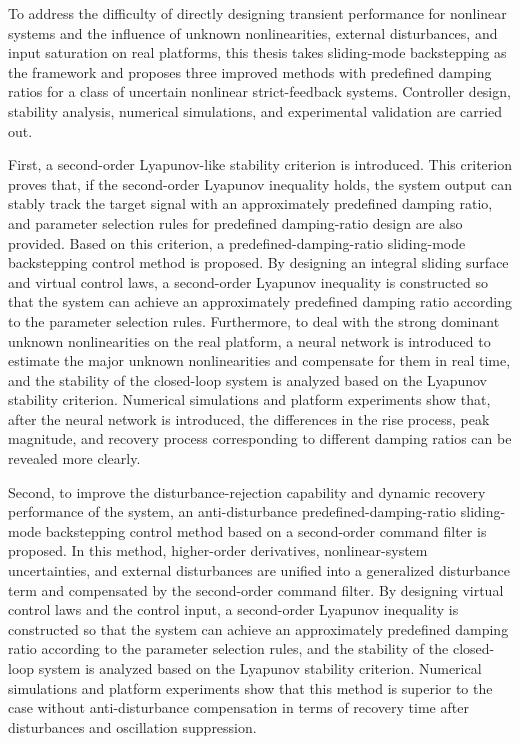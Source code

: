 \begin{eabstract}
To address the difficulty of directly designing transient performance for nonlinear systems and the influence of unknown nonlinearities, external disturbances, and input saturation on real platforms, this thesis takes sliding-mode backstepping as the framework and proposes three improved methods with predefined damping ratios for a class of uncertain nonlinear strict-feedback systems. Controller design, stability analysis, numerical simulations, and experimental validation are carried out.

First, a second-order Lyapunov-like stability criterion is introduced. This criterion proves that, if the second-order Lyapunov inequality holds, the system output can stably track the target signal with an approximately predefined damping ratio, and parameter selection rules for predefined damping-ratio design are also provided. Based on this criterion, a predefined-damping-ratio sliding-mode backstepping control method is proposed. By designing an integral sliding surface and virtual control laws, a second-order Lyapunov inequality is constructed so that the system can achieve an approximately predefined damping ratio according to the parameter selection rules. Furthermore, to deal with the strong dominant unknown nonlinearities on the real platform, a neural network is introduced to estimate the major unknown nonlinearities and compensate for them in real time, and the stability of the closed-loop system is analyzed based on the Lyapunov stability criterion. Numerical simulations and platform experiments show that, after the neural network is introduced, the differences in the rise process, peak magnitude, and recovery process corresponding to different damping ratios can be revealed more clearly.

Second, to improve the disturbance-rejection capability and dynamic recovery performance of the system, an anti-disturbance predefined-damping-ratio sliding-mode backstepping control method based on a second-order command filter is proposed. In this method, higher-order derivatives, nonlinear-system uncertainties, and external disturbances are unified into a generalized disturbance term and compensated by the second-order command filter. By designing virtual control laws and the control input, a second-order Lyapunov inequality is constructed so that the system can achieve an approximately predefined damping ratio according to the parameter selection rules, and the stability of the closed-loop system is analyzed based on the Lyapunov stability criterion. Numerical simulations and platform experiments show that this method is superior to the case without anti-disturbance compensation in terms of recovery time after disturbances and oscillation suppression.


\end{eabstract}
